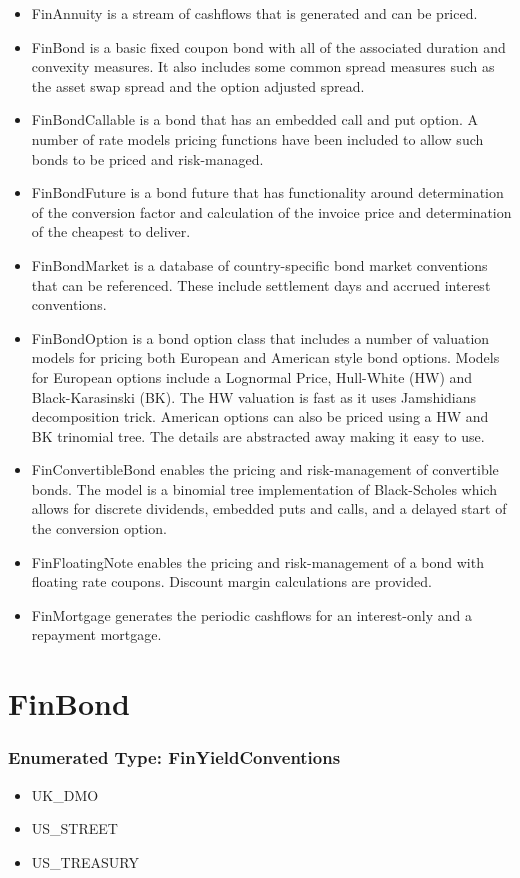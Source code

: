 \documentclass[twoside,11pt]{book}
\begin{document}
\begin{itemize}
\item{ FinAnnuity is a stream of cashflows that is generated and can be priced.
}
\item{ FinBond is a basic fixed coupon bond with all of the associated duration and convexity measures. It also includes some common spread measures such as the asset swap spread and the option adjusted spread.
}
\item{ FinBondCallable is a bond that has an embedded call and put option. A number of rate models pricing functions have been included to allow such bonds to be priced and risk-managed.
}
\item{ FinBondFuture is a bond future that has functionality around determination of the conversion factor and calculation of the invoice price and determination of the cheapest to deliver. 
}
\item{ FinBondMarket is a database of country-specific bond market conventions that can be referenced. These include settlement days and accrued interest conventions.
}
\item{ FinBondOption is a bond option class that includes a number of valuation models for pricing both European and American style bond options. Models for European options include a Lognormal Price, Hull-White (HW) and Black-Karasinski (BK). The HW valuation is fast as it uses Jamshidians decomposition trick. American options can also be priced using a HW and BK trinomial tree. The details are abstracted away making it easy to use.
}
\item{ FinConvertibleBond enables the pricing and risk-management of convertible bonds. The model is a binomial tree implementation of Black-Scholes which allows for discrete dividends, embedded puts and calls, and a delayed start of the conversion option.
}
\item{ FinFloatingNote enables the pricing and risk-management of a bond with floating rate coupons. Discount margin calculations are provided.
}
\item{ FinMortgage generates the periodic cashflows for an interest-only and a repayment mortgage. }
\end{itemize}
\newpage
\section{FinBond}

\subsubsection{Enumerated Type: FinYieldConventions}
\begin{itemize}
\item{UK\_DMO}
\item{US\_STREET}
\item{US\_TREASURY}
\end{itemize}
\end{document}
